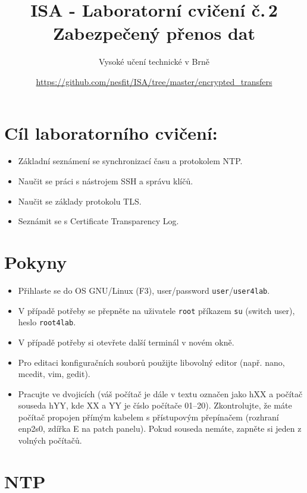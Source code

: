 \documentclass[a4paper,11pt]{article}
\title{ISA - Laboratorní cvičení č.\,2\\
{\bf\large Zabezpečený přenos dat}}
\author{Vysoké učení technické v Brně}
\date{\url{https://github.com/nesfit/ISA/tree/master/encrypted_transfers}}
\begin{document}
{\let\newpage\relax\maketitle}

\section*{Cíl laboratorního cvičení:}
\begin{itemize}
  \item Základní seznámení se synchronizací času a protokolem NTP.
  \item Naučit se práci s nástrojem SSH a správu klíčů.
  \item Naučit se základy protokolu TLS.
  \item Seznámit se s Certificate Transparency Log.
\end{itemize}

\section*{Pokyny}
\begin{itemize}
  \item Přihlaste se do OS GNU/Linux (F3), user/password {\tt user}/{\tt user4lab}.
  \item V případě potřeby se přepněte na uživatele {\tt root} příkazem {\tt su}
  (switch user), heslo {\tt root4lab}.
  \item V případě potřeby si otevřete další terminál v novém okně.
  \item Pro editaci konfiguračních souborů použijte libovolný editor (např.
  nano, mcedit, vim, gedit).
\item Pracujte ve dvojicích (váš počítač je dále v textu označen jako hXX a
  počítač souseda hYY, kde XX a YY je číslo počítače 01--20). Zkontrolujte, že máte počítač propojen
    přímým kabelem s přístupovým přepínačem (rozhraní enp2s0, zdířka E na patch
    panelu). Pokud souseda nemáte, zapněte si jeden z volných počítačů.

\end{itemize}

\section{NTP}
\end{document}
